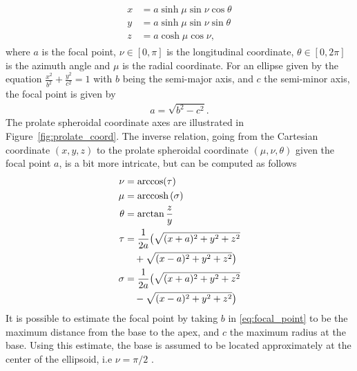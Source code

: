 \begin{align}
  \begin{split}
    x &= a \sinh \mu \sin \nu \cos \theta  \\
    y &= a \sinh \mu \sin \nu \sin \theta  \\
    z &= a \cosh \mu \cos \nu,
  \end{split}
\end{align}
where $a$ is the focal point, $\nu \in [0, \pi]$ is the longitudinal
coordinate, $\theta \in [0, 2\pi]$ is the azimuth angle and $\mu$
is the radial coordinate. For an ellipse given by the equation
$\frac{x^2}{b^2} +\frac{y^2}{c^2}  = 1$ with $b$ being the semi-major
axis, and $c$ the semi-minor axis, the focal point is given by
\begin{align}
  a =\sqrt{b^2 - c^2}.
  \label{eq:focal_point}
\end{align}
The prolate spheroidal coordinate axes are illustrated in
Figure~\ref{fig:prolate_coord}. The inverse relation, going from the
Cartesian coordinate $(x,y,z)$ to the prolate spheroidal coordinate
$(\mu, \nu, \theta)$ given the focal point $a$, is a bit more
intricate, but can be computed as follows 
\begin{align}
  \begin{split}
    \nu &= \arccos (\tau) \\
    \mu &= \mathrm{arccosh} \hspace{0.05cm} (\sigma) \\
    \theta &= \arctan \frac{z}{y} \\
    \tau &= \frac{1}{2a} \big( \sqrt{(x + a)^2 + y^2 + z^2} \\
    & \quad + \sqrt{(x - a)^2 + y^2 + z^2} \big) \\
    \sigma &= \frac{1}{2a} \big( \sqrt{(x + a)^2 + y^2 + z^2}\\
    & \quad - \sqrt{(x - a)^2 + y^2 + z^2}\big) 
  \end{split}
\end{align}
It is possible to estimate the focal point by taking $b$ in
\eqref{eq:focal_point} to be the maximum distance from the base to the
apex, and $c$ the maximum radius at the base. Using this estimate,
the base is assumed to be located approximately at the center of the
ellipsoid, i.e $\nu = \pi / 2$ \cite{land2015verification}.
